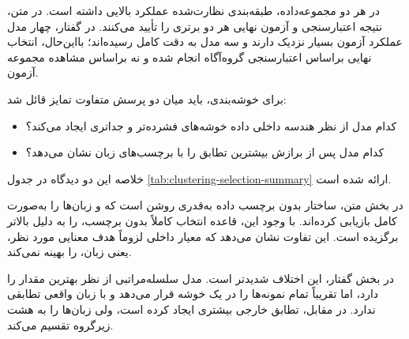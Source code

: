 \documentclass[12pt,a4paper,oneside]{report}
\begin{document}
در هر دو مجموعه‌داده، طبقه‌بندی نظارت‌شده عملکرد بالایی داشته است. در متن، نتیجه اعتبارسنجی و آزمون نهایی هر دو برتری
را تأیید می‌کنند. در گفتار، چهار مدل عملکرد آزمون بسیار نزدیک دارند و سه مدل به دقت کامل رسیده‌اند؛ بااین‌حال، انتخاب نهایی براساس اعتبارسنجی گروه‌آگاه انجام شده و نه براساس مشاهده مجموعه آزمون.

برای خوشه‌بندی، باید میان دو پرسش متفاوت تمایز قائل شد:

\begin{itemize}
	\item کدام مدل از نظر هندسه داخلی داده خوشه‌های فشرده‌تر و جدا‌تری ایجاد می‌کند؟
	\item کدام مدل پس از برازش بیشترین تطابق را با برچسب‌های زبان نشان می‌دهد؟
\end{itemize}

خلاصه این دو دیدگاه در جدول
\ref{tab:clustering-selection-summary}
ارائه شده است.

\begin{table}[H]
\centering
\caption{تفاوت انتخاب داخلی و تطابق خارجی در خوشه‌بندی}
\label{tab:clustering-selection-summary}
\small
{}
\end{table}

در بخش متن، ساختار بدون برچسب داده به‌قدری روشن است که
و
زبان‌ها را به‌صورت کامل بازیابی کرده‌اند. با وجود این، قاعده انتخاب کاملاً بدون برچسب،
را به دلیل
بالاتر برگزیده است. این تفاوت نشان می‌دهد که معیار داخلی لزوماً هدف معنایی مورد نظر، یعنی زبان، را بهینه نمی‌کند.

در بخش گفتار، این اختلاف شدیدتر است. مدل سلسله‌مراتبی از نظر
بهترین مقدار را دارد، اما تقریباً تمام نمونه‌ها را در یک خوشه قرار می‌دهد و با زبان واقعی تطابقی ندارد. در مقابل،
تطابق خارجی بیشتری ایجاد کرده است، ولی زبان‌ها را به هشت زیرگروه تقسیم می‌کند.
\end{document}
